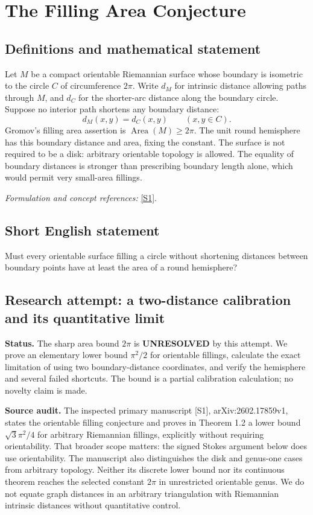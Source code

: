 \documentclass[11pt]{article}
\begin{document}
\section*{\texorpdfstring{The Filling Area Conjecture}{The Filling Area Conjecture}}\label{statement}
\subsection{Definitions and mathematical statement}
Let $M$ be a compact orientable Riemannian surface whose boundary is isometric to the circle $C$ of circumference $2\pi$. Write $d_M$ for intrinsic distance allowing paths through $M$, and $d_C$ for the shorter-arc distance along the boundary circle. Suppose no interior path shortens any boundary distance:
\[
 d_M(x,y)=d_C(x,y)\qquad(x,y\in C).
\]
Gromov's filling area assertion is $\operatorname{Area}(M)\ge2\pi$. The unit round hemisphere has this boundary distance and area, fixing the constant. The surface is not required to be a disk: arbitrary orientable topology is allowed. The equality of boundary distances is stronger than prescribing boundary length alone, which would permit very small-area fillings.
\par\smallskip\textit{Formulation and concept references:} \href{https://arxiv.org/abs/2602.17859}{[S1]}.

\subsection{Short English statement}
Must every orientable surface filling a circle without shortening distances between boundary points have at least the area of a round hemisphere?
\subsection{Research attempt: a two-distance calibration and its quantitative limit}
\textbf{Status.} The sharp area bound $2\pi$ is \textbf{UNRESOLVED} by this attempt. We prove an elementary lower bound $\pi^2/2$ for orientable fillings, calculate the exact limitation of using two boundary-distance coordinates, and verify the hemisphere and several failed shortcuts. The bound is a partial calibration calculation; no novelty claim is made.

\textbf{Source audit.} The inspected primary manuscript [S1], arXiv:2602.17859v1, states the orientable filling conjecture and proves in Theorem 1.2 a lower bound $\sqrt3\pi^2/4$ for arbitrary Riemannian fillings, explicitly without requiring orientability. That broader scope matters: the signed Stokes argument below does use orientability. The manuscript also distinguishes the disk and genus-one cases from arbitrary topology. Neither its discrete lower bound nor its continuous theorem reaches the selected constant $2\pi$ in unrestricted orientable genus. We do not equate graph distances in an arbitrary triangulation with Riemannian intrinsic distances without quantitative control.
\end{document}
